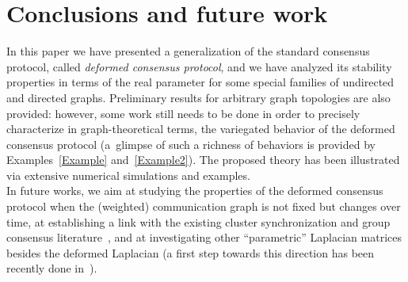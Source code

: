 \documentclass[letterpaper,9pt,twocolumn]{autart}
\begin{document}
\section{Conclusions and future work}\label{Sect:concl}
\vspace{-0.25cm}
In this paper we have presented a generalization of the standard consensus protocol,
called \emph{deformed consensus protocol}, and we have analyzed its stability properties
in terms of the real parameter  for some special families of undirected and directed graphs.
Preliminary results for arbitrary graph topologies are also provided: however, some work still needs
to be done in order to precisely characterize in graph-theoretical
terms, the variegated behavior of the deformed consensus protocol
(a~glimpse of such a richness of behaviors is provided
by Examples~\ref{Example} and~\ref{Example2}). The proposed theory has been illustrated
via \mbox{extensive} numerical simulations and examples.\vspace{0.05cm}\\
In future works, we aim at studying the properties of the deformed consensus protocol when the
(weighted) communication graph is not fixed but changes over time, 
at establishing a link with the existing cluster synchronization
and group consensus literature~\cite{YuWa_SCL10,XiaCa_AUTO11},
and at investigating other ``parametric'' Laplacian matrices besides
the deformed Laplacian (a first step towards this direction has 
been recently done in~\cite{Morbidi_TAC13}). 
 
\end{document}
